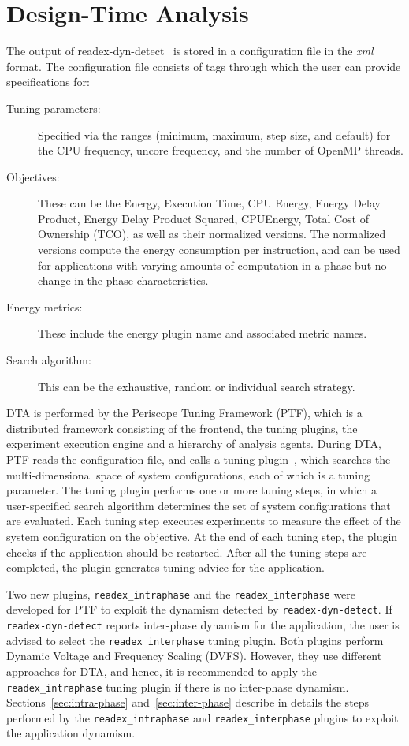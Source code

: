 \section{Design-Time Analysis} \label{sec:dta}
The output of readex-dyn-detect~\cite{kumaraswamy2018design} is stored in a configuration file in the \textit{xml} format. The configuration file consists of tags through which the user can provide specifications for:
\begin{description}
	\item [Tuning parameters:] Specified via the ranges (minimum, maximum, step size, and default) for the CPU frequency, uncore frequency, and the number of OpenMP threads.
	\item [Objectives:] These can be the Energy, Execution Time, CPU Energy, Energy Delay Product, Energy Delay Product Squared, CPUEnergy, Total Cost of Ownership (TCO), as well as their normalized versions. The normalized versions compute the energy consumption per instruction, and can be used for applications with varying amounts of computation in a phase but no change in the phase characteristics.
	\item [Energy metrics:] These include the energy plugin name and associated metric names. 
	\item [Search algorithm:] This can be the exhaustive, random or individual search strategy.
\end{description}

DTA is performed by the Periscope Tuning Framework (PTF), which is a distributed framework consisting of the frontend, the tuning plugins, the experiment execution engine and a hierarchy of analysis agents. During DTA, PTF reads the configuration file, and calls a tuning plugin~\cite{AutoTune:Book2015}, which searches the multi-dimensional space of system configurations, each of which is a tuning parameter. The tuning plugin performs one or more tuning steps, in which a user-specified search algorithm determines the set of system configurations that are evaluated. Each tuning step executes experiments to measure the effect of the system configuration on the objective. At the end of each tuning step, the plugin checks if the application should be restarted. After all the tuning steps are completed, the plugin generates tuning advice for the application.

Two new plugins, \texttt{readex\_intraphase} and the \texttt{readex\_interphase} were developed for PTF to exploit the dynamism detected by \texttt{readex-dyn-detect}. If \texttt{readex-dyn-detect} reports inter-phase dynamism for the application, the user is advised to select the \texttt{readex\_interphase} tuning plugin. Both plugins perform Dynamic Voltage and Frequency Scaling (DVFS). However, they use different approaches for DTA, and hence, it is recommended to apply the \texttt{readex\_intraphase} tuning plugin if there is no inter-phase dynamism. Sections~\ref{sec:intra-phase} and~\ref{sec:inter-phase} describe in details the steps performed by the \texttt{readex\_intraphase} and \texttt{readex\_interphase} plugins to exploit the application dynamism.


